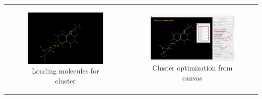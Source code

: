 \documentclass[10pt]{article}
\begin{document}
\begin{enumerate}
\hspace*{-5mm}
\begin{center}
\begin{tabular}{cc}
\begin{minipage}{.45\linewidth}
\begin{figure}[H]
\begin{center}
\includegraphics[width=.8\linewidth]{damqt320_epic_1.png}
\end{center}
\caption{{Loading molecules for cluster} \label{fig:A6_1}}
\end{figure}
\end{minipage}
&
\begin{minipage}{.48\linewidth}
\begin{figure}[H]
\begin{center}
\includegraphics[width=.95\linewidth]{damqt320_epic_2_b.png}
\end{center}
\caption{{Cluster optimization from canvas}\label{fig:A6_2}}
\end{figure}
\end{minipage}
\end{tabular}
\end{center}


\end{enumerate}
\end{document}
